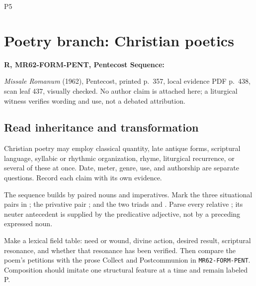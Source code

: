 \begin{courseunit}{P5}
\chapter{Poetry branch: Christian poetics}

\textbf{R, MR62-FORM-PENT, Pentecost Sequence:}
\begin{quote}
\end{quote}

\textit{Missale Romanum} (1962), Pentecost, printed p.~357, local evidence PDF
p.~438, scan leaf 437, visually checked. No author claim is attached here; a
liturgical witness verifies wording and use, not a debated attribution.

\section{Read inheritance and transformation}

Christian poetry may employ classical quantity, late antique forms, scriptural
language, syllabic or rhythmic organization, rhyme, liturgical recurrence, or
several of these at once. Date, meter, genre, use, and authorship are separate
questions. Record each claim with its own evidence.

The sequence builds by paired nouns and imperatives. Mark the three situational
pairs in ; the privative pair
; and the two triads
 and . Parse every relative
; its neuter antecedent is supplied by the predicative adjective,
not by a preceding expressed noun.

Make a lexical field table: need or wound, divine action, desired result,
scriptural resonance, and whether that resonance has been verified. Then
compare the poem's petitions with the prose Collect and Postcommunion in
\texttt{MR62-FORM-PENT}. Composition should imitate one structural feature at
a time and remain labeled P.


\end{courseunit}
